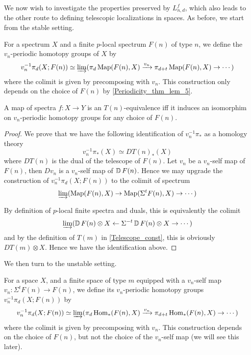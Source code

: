	We now wish to investigate the properties preserved by $L_{n,d}^f$, which also leads to the other route to defining telescopic localizations in spaces. As before, we start from the stable setting. 

	\begin{defn}\label{Periodic_homotopy_grp_sp}
		For a spectrum $X$ and a finite $p$-local spectrum $F(n)$ of type $n$, we define the $v_n$-periodic homotopy groups of $X$ by 
		\[ v_n^{-1}\pi_d(X;F(n))\simeq\varinjlim(\pi_d\operatorname{\mathrm{Map}}(F(n),X)\xrightarrow{v_n}\pi_{d+t}\operatorname{\mathrm{Map}}(F(n),X)\to\cdots) \]
		where the colimit is given by precomposing with $v_n$. This construction only depends on the choice of $F(n)$ by \cref{Periodicity_thm_lem_5}. 
	\end{defn}

	\begin{prop}\label{T_n_loc_crit}
		A map of spectra $f:X\to Y$ is an $T(n)$-equivalence iff it induces an isomorphim on $v_n$-periodic homotopy groups for any choice of $F(n)$. 
	\end{prop}
	\begin{proof}
		We prove that we have the following identification of $v_n^{-1}\pi_*$ as a homology theory
		\[ v_n^{-1}\pi_*(X)\simeq DT(n)_*(X) \]
		where $DT(n)$ is the dual of the telescope of $F(n)$. Let $v_n$ be a $v_n$-self map of $F(n)$, then $Dv_n$ is a $v_n$-self map of $\operatorname{\mathbb{D}} F(n)$. Hence we may upgrade the construction of $v_n^{-1}\pi_d(X;F(n))$ to the colimit of spectrum 
		\[ \varinjlim(\operatorname{\mathrm{Map}}(F(n),X)\to\operatorname{\mathrm{Map}}(\Sigma^tF(n),X)\to\cdots) \]

		By definition of $p$-local finite spectra and duals, this is equivalently the colimit 
		\[ \varinjlim(\operatorname{\mathbb{D}} F(n)\otimes X\leftarrow\Sigma^{-t}\operatorname{\mathbb{D}} F(n)\otimes X\to\cdots) \]
		and by the definition of $T(m)$ in \cref{Telescope_const}, this is obviously $DT(m)\otimes X$. Hence we have the identification above. 
	\end{proof}

	We then turn to the unstable setting. 

	\begin{defn}\label{Periodic_homotopy_grp}
		For a space $X$, and a finite space of type $m$ equipped with a $v_n$-self map $v_n:\Sigma^tF(n)\to F(n)$, we define its $v_n$-periodic homotopy groups $v_n^{-1}\pi_d(X;F(n))$ by 
		\[ v_n^{-1}\pi_d(X;F(n))\simeq\varinjlim(\pi_d\operatorname{\mathrm{Hom}}_*(F(n),X)\xrightarrow{v_n}\pi_{d+t}\operatorname{\mathrm{Hom}}_*(F(n),X)\to\cdots) \]
		where the colimit is given by precomposing with $v_n$. This construction depends on the choice of $F(n)$, but not the choice of the $v_n$-self map (we will see this later). 
	\end{defn}

